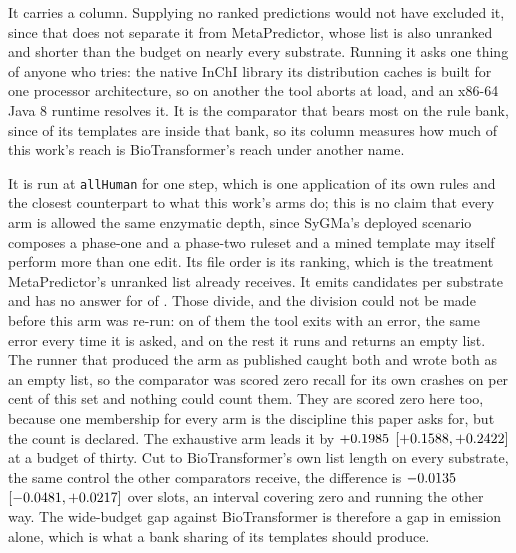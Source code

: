 \documentclass[journal=jcisd8,manuscript=suppinfo,layout=onecolumn]{achemso}
\begin{document}
It carries a column. Supplying no ranked predictions would not have excluded it, since that
does not separate it from MetaPredictor, whose list is also unranked and shorter than the budget on
nearly every substrate. Running it asks one thing of anyone who tries: the
native InChI library its distribution caches is built for one processor architecture, so on
another the tool aborts at load, and an x86-64 Java 8 runtime resolves it. It is the comparator that
bears most on the rule bank, since \numThirdpartyBiotransformerShipped{} of its templates
are inside that bank, so its column measures how much of this work's reach is BioTransformer's
reach under another name.

It is run at \texttt{allHuman} for one step, which is one application of its own rules and the
closest counterpart to what this work's arms do; this is no claim that every arm is allowed the
same enzymatic depth, since SyGMa's deployed scenario composes a phase-one and a phase-two ruleset
and a mined template may itself perform more than one edit. Its file order is its ranking, which
is the treatment MetaPredictor's unranked list already receives. It emits \numBtarmEmitted{}
candidates per substrate and has no answer for \numBtarmSilent{} of \numPopulationN{}. Those
divide, and the division could not be made before this arm was re-run: on \numBtstepsCrashes{} of
them the tool exits with an error, the same error every time it is asked, and on the rest it runs
and returns an empty list. The runner that produced the arm as published caught both and wrote
both as an empty list, so the comparator was scored zero recall for its own crashes on
\numBtstepsCrashsharepct{} per cent of this set and nothing could count them. They are scored zero
here too, because one membership for every arm is the discipline this paper asks for, but the
count is declared. The exhaustive arm
leads it by $+0.1985$ $[+0.1588, +0.2422]$ at a
budget of thirty. Cut to BioTransformer's own list length on every substrate, the same control the
other comparators receive, the difference is $-0.0135$ $[-0.0481,
+0.0217]$ over \numBtarmMatchedslots{} slots, an interval covering zero and running
the other way. The wide-budget gap against BioTransformer is therefore a gap in emission alone,
which is what a bank sharing \numThirdpartyBiotransformerShipped{} of its templates should produce.
\end{document}

